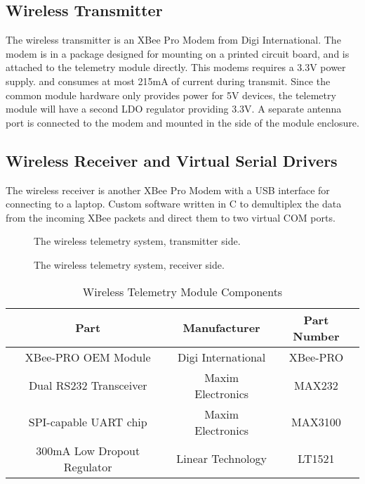 \subsection{Wireless Transmitter}

The wireless transmitter is an XBee Pro Modem from Digi International. The modem is in a package designed for mounting on a printed circuit board, and is attached to the telemetry module directly. This modems requires a 3.3V power supply. and consumes at most 215mA of current during transmit. Since the common module hardware only provides power for 5V devices, the telemetry module will have a second LDO regulator providing 3.3V. A separate antenna port is connected to the modem and mounted in the side of the module enclosure.

\subsection{Wireless Receiver and Virtual Serial Drivers}

The wireless receiver is another XBee Pro Modem with a USB interface for connecting to a laptop. Custom software written in C to demultiplex the data from the incoming XBee packets and direct them to two virtual COM ports.

  \begin{figure}[H]
    \centering
      
    \caption{The wireless telemetry system, transmitter side.\label{fig:tele_tx_overview}}
  \end{figure}

  \begin{figure}[H]
    \centering
      
    \caption{The wireless telemetry system, receiver side.\label{fig:tele_rx_overview}}
  \end{figure}

  \begin{table}[H]
    \caption{Wireless Telemetry Module Components\label{tab:Wireless-Telemetry-Module}}
    \centering
      \begin{tabular}{|c|c|c|}
	\hline 
	Part & Manufacturer & Part Number\tabularnewline
	\hline
	\hline
	XBee-PRO OEM Module & Digi International & XBee-PRO\tabularnewline
	\hline 
	Dual RS232 Transceiver & Maxim Electronics & MAX232\tabularnewline
	\hline 
	SPI-capable UART chip & Maxim Electronics & MAX3100\tabularnewline
	\hline 
	300mA Low Dropout Regulator & Linear Technology & LT1521\tabularnewline
	\hline
      \end{tabular}
  \end{table}

